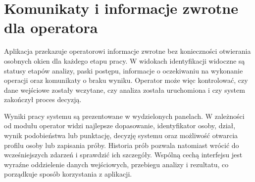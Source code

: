 \section{Komunikaty i informacje zwrotne dla operatora}

Aplikacja przekazuje operatorowi informacje zwrotne bez konieczności otwierania osobnych okien dla każdego etapu pracy. W widokach identyfikacji widoczne są statusy etapów analizy, paski postępu, informacje o oczekiwaniu na wykonanie operacji oraz komunikaty o braku wyniku. Operator może więc kontrolować, czy dane wejściowe zostały wczytane, czy analiza została uruchomiona i czy system zakończył proces decyzją.

Wyniki pracy systemu są prezentowane w wydzielonych panelach. W zależności od modułu operator widzi najlepsze dopasowanie, identyfikator osoby, dział, wynik podobieństwa lub punktację, decyzję systemu oraz możliwość otwarcia profilu osoby lub zapisania próby. Historia prób pozwala natomiast wrócić do wcześniejszych zdarzeń i sprawdzić ich szczegóły. Wspólną cechą interfejsu jest wyraźne oddzielenie danych wejściowych, przebiegu analizy i rezultatu, co porządkuje sposób korzystania z aplikacji.